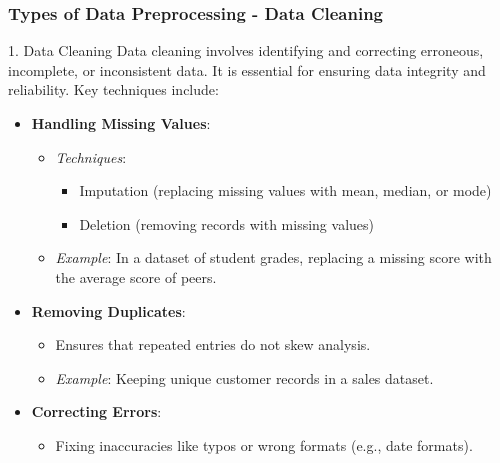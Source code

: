 \documentclass{beamer}
\begin{document}
\begin{frame}[fragile]
    \frametitle{Types of Data Preprocessing - Data Cleaning}
    \begin{block}{1. Data Cleaning}
        Data cleaning involves identifying and correcting erroneous, incomplete, or inconsistent data.
        It is essential for ensuring data integrity and reliability. Key techniques include:
        \begin{itemize}
            \item \textbf{Handling Missing Values}:
                \begin{itemize}
                    \item \textit{Techniques}: 
                        \begin{itemize}
                            \item Imputation (replacing missing values with mean, median, or mode)
                            \item Deletion (removing records with missing values)
                        \end{itemize}
                    \item \textit{Example}: In a dataset of student grades, replacing a missing score with the average score of peers.
                \end{itemize}

            \item \textbf{Removing Duplicates}:
                \begin{itemize}
                    \item Ensures that repeated entries do not skew analysis.
                    \item \textit{Example}: Keeping unique customer records in a sales dataset.
                \end{itemize}

            \item \textbf{Correcting Errors}:
                \begin{itemize}
                    \item Fixing inaccuracies like typos or wrong formats (e.g., date formats).
                \end{itemize}
        \end{itemize}
    \end{block}
\end{frame}
\end{document}
